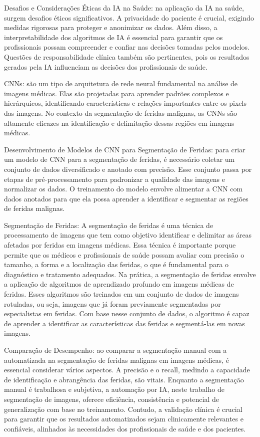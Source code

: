 Desafios e Considerações Éticas da \ac{IA} na Saúde: na aplicação da \ac{IA} na saúde, surgem desafios éticos significativos. A privacidade do paciente é crucial, exigindo medidas rigorosas para proteger e anonimizar os dados. Além disso, a interpretabilidade dos algoritmos de \ac{IA} é essencial para garantir que os profissionais possam compreender e confiar nas decisões tomadas pelos modelos. Questões de responsabilidade clínica também são pertinentes, pois os resultados gerados pela \ac{IA} influenciam as decisões dos profissionais de saúde.

\ac{CNNs}: são um tipo de arquitetura de rede neural fundamental na análise de imagens médicas. Elas são projetadas para aprender padrões complexos e hierárquicos, identificando características e relações importantes entre os pixels das imagens. No contexto da segmentação de feridas malignas, as \ac{CNNs} são altamente eficazes na identificação e delimitação dessas regiões em imagens médicas.

Desenvolvimento de Modelos de \ac{CNN} para Segmentação de Feridas: para criar um modelo de \ac{CNN} para a segmentação de feridas, é necessário coletar um conjunto de dados diversificado e anotado com precisão. Esse conjunto passa por etapas de pré-processamento para padronizar a qualidade das imagens e normalizar os dados. O treinamento do modelo envolve alimentar a \ac{CNN} com dados anotados para que ela possa aprender a identificar e segmentar as regiões de feridas malignas.

Segmentação de Feridas: A segmentação de feridas é uma técnica de processamento de imagens que tem como objetivo identificar e delimitar as áreas afetadas por feridas em imagens médicas. Essa técnica é importante porque permite que os médicos e profissionais de saúde possam avaliar com precisão o tamanho, a forma e a localização das feridas, o que é fundamental para o diagnóstico e tratamento adequados. Na prática, a segmentação de feridas envolve a aplicação de algoritmos de aprendizado profundo em imagens médicas de feridas. Esses algoritmos são treinados em um conjunto de dados de imagens rotuladas, ou seja, imagens que já foram previamente segmentadas por especialistas em feridas. Com base nesse conjunto de dados, o algoritmo é capaz de aprender a identificar as características das feridas e segmentá-las em novas imagens.

Comparação de Desempenho: ao comparar a segmentação manual com a automatizada na segmentação de feridas malignas em imagens médicas, é essencial considerar vários aspectos. A precisão e o recall, medindo a capacidade de identificação e abrangência das feridas, são vitais. Enquanto a segmentação manual é trabalhosa e subjetiva, a automação por IA, neste trabalho de segmentação de imagens, oferece eficiência, consistência e potencial de generalização com base no treinamento. Contudo, a validação clínica é crucial para garantir que os resultados automatizados sejam clinicamente relevantes e confiáveis, alinhados às necessidades dos profissionais de saúde e dos pacientes.

